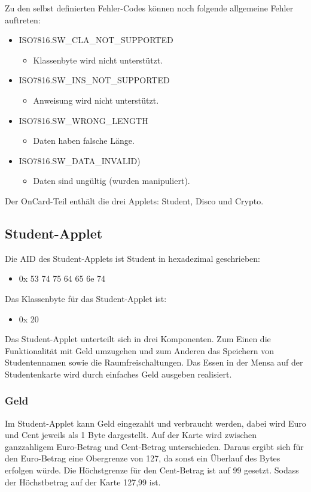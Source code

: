 Zu den selbst definierten Fehler-Codes können noch folgende allgemeine Fehler auftreten:
\begin{itemize}
	\item ISO7816.SW\_CLA\_NOT\_SUPPORTED
	\begin{itemize}
		\item Klassenbyte wird nicht unterstützt.
	\end{itemize}
	\item ISO7816.SW\_INS\_NOT\_SUPPORTED
	\begin{itemize}
		\item Anweisung wird nicht unterstützt.
	\end{itemize}
	\item ISO7816.SW\_WRONG\_LENGTH
	\begin{itemize}
		\item Daten haben falsche Länge.
	\end{itemize}
	\item ISO7816.SW\_DATA\_INVALID)
	\begin{itemize}
		\item Daten sind ungültig (wurden manipuliert).
	\end{itemize}
\end{itemize}

Der OnCard-Teil enthält die drei Applets: Student, Disco und Crypto.

\subsection{Student-Applet}

Die AID des Student-Applets ist Student in hexadezimal geschrieben:
\begin{itemize}
	\item 0x 53 74 75 64 65 6e 74
\end{itemize}
Das Klassenbyte für das Student-Applet ist:
\begin{itemize}
	\item 0x 20
\end{itemize}

Das Student-Applet unterteilt sich in drei Komponenten.
Zum Einen die Funktionalität mit Geld umzugehen und zum Anderen das Speichern von Studentennamen sowie die Raumfreischaltungen.
Das Essen in der Mensa auf der Studentenkarte wird durch einfaches Geld ausgeben realisiert.

\subsubsection{Geld}
\label{label:geld}
Im Student-Applet kann Geld eingezahlt und verbraucht werden, dabei wird Euro und Cent jeweils als 1 Byte dargestellt.
Auf der Karte wird zwischen ganzzahligem Euro-Betrag und Cent-Betrag unterschieden.
Daraus ergibt sich für den Euro-Betrag eine Obergrenze von 127\texteuro{}, da sonst ein Überlauf des Bytes erfolgen würde.
Die Höchstgrenze für den Cent-Betrag ist auf 99\textcent{} gesetzt.
Sodass der Höchstbetrag auf der Karte 127,99\texteuro{} ist.

